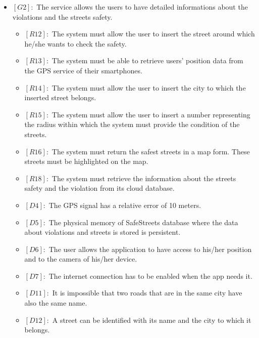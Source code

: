 \documentclass[titlepage]{article}
\begin{document}
\begin{itemize}
\begin{itemize}
 	
 \end{itemize}
 \item $[G2]:$ The service allows the users to have detailed informations about the violations and the streets safety.
 \begin{itemize}
 	\item $[R12]:$ The system must allow the user to insert the street around which he/she wants to check the safety.
 	\item $[R13]:$ The system must be able to retrieve users' position data from the GPS service of their smartphones.
 	\item $[R14]:$ The system must allow the user to insert the city to which the inserted street belongs.
 	\item $[R15]:$ The system must allow the user to insert a number representing the radius within which the system must provide the condition of the streets.
 	\item $[R16]:$ The system must return the  safest streets in a map form. These streets must be highlighted on the map.
 	\item $[R18]:$ The system must retrieve the information about the streets safety and the violation from its cloud database.
 	\item $[D4]:$ The GPS signal has a relative error of 10 meters.
 	\item $[D5]:$ The physical memory of SafeStreets database where the data about violations and streets is stored is persistent.
 	\item $[D6]:$ The user allows the application to have access to his/her position and to the camera of his/her device.
 	\item $[D7]:$ The internet connection has to be enabled when the app needs it.
 	\item $[D11]:$ It is impossible that two roads that are in the same city have also the same name.
 	\item $[D12]:$ A street can be identified with its name and the city to which it belongs.
 \end{itemize}
 
 
 

\end{itemize}
\end{document}

